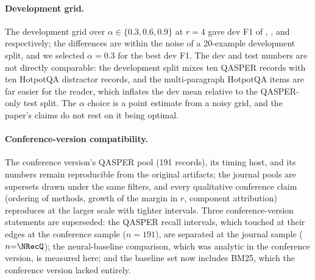 \documentclass[pdflatex,sn-basic]{sn-jnl}
\theoremstyle{remark}
\begin{document}
\begin{appendices}
\paragraph{Development grid.}
The development grid over $\alpha \in \{0.3, 0.6, 0.9\}$ at $r=4$
gave dev F1 of \GridALo, \GridAMid, and \GridAHi{} respectively; the
differences are within the noise of a 20-example development split,
and we selected $\alpha=0.3$ for the best dev F1. The dev and test
numbers are not directly comparable: the development split mixes ten
QASPER records with ten HotpotQA distractor records, and the
multi-paragraph HotpotQA items are far easier for the reader, which
inflates the dev mean relative to the QASPER-only test split. The
$\alpha$ choice is a point estimate from a noisy grid, and the
paper's claims do not rest on it being optimal.

\paragraph{Conference-version compatibility.}
The conference version's QASPER pool (191 records), its timing host,
and its numbers remain reproducible from the original artifacts; the
journal pools are supersets drawn under the same filters, and every
qualitative conference claim (ordering of methods, growth of the
margin in $r$, component attribution) reproduces at the larger scale
with tighter intervals. Three conference-version statements are
superseded: the QASPER recall intervals, which touched at their edges
at the conference sample ($n=191$), are separated at the journal
sample ($n{=}\NRecQ$); the neural-baseline
comparison, which was analytic in the conference version, is measured
here; and the baseline set now includes BM25, which the conference
version lacked entirely.

\end{appendices}


\end{document}
